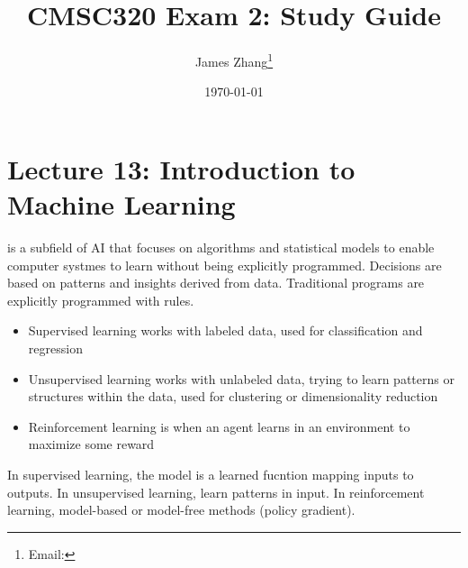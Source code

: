 \documentclass[12pt]{scrartcl}
\begin{document}
\title{CMSC320 Exam 2: Study Guide}
\author{James Zhang\thanks{Email: }}
\date{\today}



\maketitle

\tableofcontents

\section{Lecture 13: Introduction to Machine Learning}

\begin{definition}
   is a subfield of AI that focuses on algorithms and 
  statistical models to enable computer systmes to learn without being explicitly programmed.
  Decisions are based on patterns and insights derived from data. Traditional 
  programs are explicitly programmed with rules.
\end{definition}

\begin{note}

\hfill

\begin{itemize}
  \item Supervised learning works with labeled data, used for classification and regression
  \item Unsupervised learning works with unlabeled data, trying to learn patterns or structures within the data, used for clustering or dimensionality 
  reduction
  \item Reinforcement learning is when an agent learns in an environment to maximize some reward
\end{itemize}
\end{note}

\begin{note}
  In supervised learning, the model is a learned fucntion mapping inputs to outputs.
  In unsupervised learning, learn patterns in input. In reinforcement learning, model-based or model-free methods (policy gradient).
\end{note}
\end{document}
